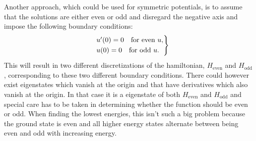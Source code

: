 \documentclass[twocolumn]{article}
\begin{document}
\begin{large}
Another approach, which could be used for symmetric potentials, is to assume that the solutions are either even or odd and disregard the negative axis and impose the following boundary conditions:
\begin{equation}
    \begin{rcases}
        &u'(0) = 0 \quad \text{for even } u, \\ 
        &u(0) = 0  \quad \text{for odd } u.
    \end{rcases}
\end{equation} 
This will result in two different discretizations of the hamiltonian, $H_\text{even}$ and $H_\text{odd}$, corresponding to these two different boundary conditions. There could however exist eigenstates which vanish at the origin and that have derivatives which also vanish at the origin. In that case it is a eigenstate of both $H_\text{even}$ and $H_\text{odd}$ and special care has to be taken in determining whether the function should be even or odd. When finding the lowest energies, this isn't such a big problem because the ground state is even and all higher energy states alternate between being even and odd with increasing energy.


\end{large}
\end{document}
